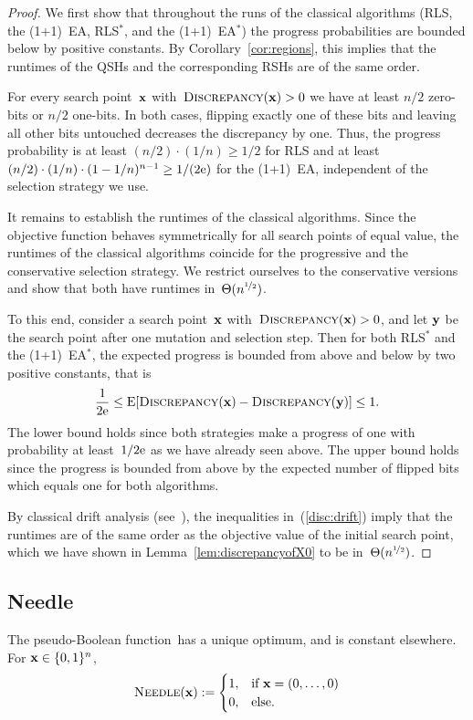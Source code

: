\documentclass[a4paper,11pt]{article}
\begin{document}
\begin{proof}
We first show that throughout the runs of the classical algorithms (RLS, the (1+1)~EA, RLS$^*$, and the (1+1)~EA$^*$) the progress probabilities are bounded below by positive constants. By Corollary~\ref{cor:regions}, this implies that the runtimes of the QSHs and the corresponding RSHs are of the same order.

For every search point~$\xvec$ with~$\discrepancy(\xvec)>0$ we have at least $n/2$ zero-bits or $n/2$ one-bits. In both cases, flipping exactly one of these bits and leaving all other bits untouched decreases the discrepancy by one. Thus, the progress probability is at least $(n/2)\cdot (1/n)\ge 1/2$ for RLS and at least $(n/2)\cdot (1/n)\cdot(1-1/n)^{n-1}\ge 1/(2\mathrm{e})$ for the (1+1)~EA, independent of the selection strategy we use. 

It remains to establish the runtimes of the classical algorithms. Since the objective function \discrepancy behaves symmetrically for all search points of equal value, the runtimes of the classical algorithms coincide for the progressive and the conservative selection strategy. We restrict ourselves to the conservative versions and show that both have runtimes in~$\Theta(n^{\nicefrac{1}{2}})$.

To this end, consider a search point~$\xvec$ with~$\discrepancy(\xvec)>0$, and let $\yvec$ be the search point after one mutation and selection step. Then for both RLS$^*$ and the (1+1)~EA$^*$, the expected progress is bounded from above and below by two positive constants, that is
\begin{equation}
\label{disc:drift}
\frac{1}{2\euler}\le\EXP[\discrepancy(\xvec)-\discrepancy(\yvec)]\le 1.
\end{equation}
The lower bound holds since both strategies make a progress of one with probability at least~$1/2\mathrm{e}$ as we have already seen above. The upper bound holds since the progress is bounded from above by the expected number of flipped bits which equals one for both algorithms.

By classical drift analysis (see~\cite{HeY04}), the inequalities in~(\ref{disc:drift}) imply that the runtimes are of the same order as the objective value of the initial search point, which we have shown in Lemma~\ref{lem:discrepancyofX0} to be in~$\Theta(n^{\nicefrac{1}{2}})$.
\end{proof}

\subsection{Needle}
\label{subsec:needle}
The pseudo-Boolean function~\needle has a unique optimum, and is constant elsewhere. For $\xvec\in\{0,1\}^n$,
\begin{equation}
\needle(\xvec):=\begin{cases}
1, & \text{if } \xvec = (0,\ldots,0)\\
0, & \text{else.}\end{cases}
\end{equation}
\end{document}
